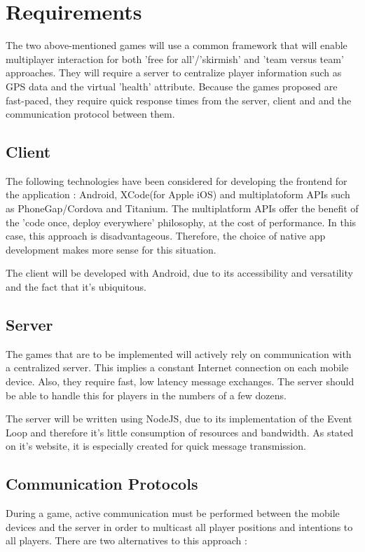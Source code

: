 \documentclass{article}
\begin{document}
\section{Requirements}

The two above-mentioned games will use a common framework that will enable
multiplayer interaction for both 'free for all'/'skirmish' and 'team versus team'
approaches. They will require a server to centralize player information such as
GPS data and the virtual 'health' attribute. Because the games proposed are
fast-paced, they require quick response times from the server, client and and
the communication protocol between them.

\subsection{Client}
The following technologies have been considered for developing the frontend for
the application : Android, XCode(for Apple iOS) and multiplatoform APIs such as
PhoneGap/Cordova and Titanium. The multiplatform APIs offer the benefit of
the 'code once, deploy everywhere' philosophy, at the cost of performance. In
this case, this approach is disadvantageous. Therefore, the choice of native app
development makes more sense for this situation.\newline

The client will be developed with Android, due to its accessibility and
versatility and the fact that it's ubiquitous.\newline

\subsection{Server}
The games that are to be implemented will actively rely on communication with a
centralized server. This implies a constant Internet connection on each mobile
device. Also, they require fast, low latency message exchanges. The server
should be able to handle this for players in the numbers of a few
dozens.\newline

The server will be written using NodeJS, due to its implementation of
the Event Loop and therefore it's little consumption of resources and bandwidth.
As stated on it's website, it is especially created for quick message
transmission.

\subsection{Communication Protocols}
During a game, active communication must be performed between the mobile devices
and the server in order to multicast all player positions and intentions to all
players. There are two alternatives to this approach :
\end{document}
